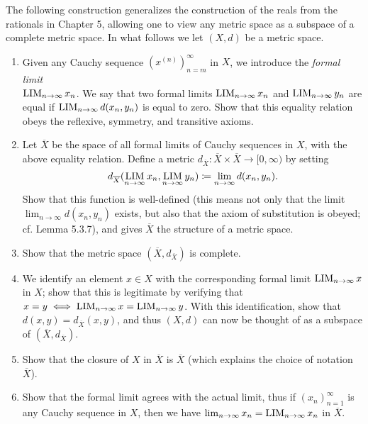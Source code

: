 \begin{ex}\label{ii:ex:1.4.8}
  The following construction generalizes the construction of the reals from the rationals in Chapter 5, allowing one to view any metric space as a subspace of a complete metric space.
  In what follows we let \((X, d)\) be a metric space.
  \begin{enumerate}
    \item Given any Cauchy sequence \((x^{(n)})_{n = m}^\infty\) in \(X\), we introduce the \emph{formal limit} \\
          \(\operatorname*{LIM}_{n \to \infty} x_n\).
          We say that two formal limits \(\operatorname*{LIM}_{n \to \infty} x_n\) and \(\operatorname*{LIM}_{n \to \infty} y_n\) are equal if \(\operatorname*{LIM}_{n \to \infty} d(x_n, y_n)\) is equal to zero.
          Show that this equality relation obeys the reflexive, symmetry, and transitive axioms.
    \item Let \(\overline{X}\) be the space of all formal limits of Cauchy sequences in \(X\), with the above equality relation.
          Define a metric \(d_{\overline{X}} : \overline{X} \times \overline{X} \to [0, \infty)\) by setting
          \[
            d_{\overline{X}}(\operatorname*{LIM}_{n \to \infty} x_n, \operatorname*{LIM}_{n \to \infty} y_n) \coloneqq \lim_{n \to \infty} d(x_n, y_n).
          \]
          Show that this function is well-defined (this means not only that the limit \\
          \(\lim_{n \to \infty} d(x_n, y_n)\) exists, but also that the axiom of substitution is obeyed;
          cf. Lemma 5.3.7), and gives \(\overline{X}\) the structure of a metric space.
    \item Show that the metric space \((\overline{X}, d_{\overline{X}})\) is complete.
    \item We identify an element \(x \in X\) with the corresponding formal limit \(\operatorname*{LIM}_{n \to \infty} x\) in \(X\);
          show that this is legitimate by verifying that \(x = y \iff \operatorname*{LIM}_{n \to \infty} x = \operatorname*{LIM}_{n \to \infty} y\).
          With this identification, show that \(d(x, y) = d_{\overline{X}}(x, y)\), and thus \((X, d)\) can now be thought of as a subspace of \((\overline{X}, d_{\overline{X}})\).
    \item Show that the closure of \(X\) in \(\overline{X}\) is \(\overline{X}\) (which explains the choice of notation \(\overline{X}\)).
    \item Show that the formal limit agrees with the actual limit, thus if \((x_n)_{n = 1}^\infty\) is any Cauchy sequence in \(X\), then we have \(\lim_{n \to \infty} x_n = \operatorname*{LIM}_{n \to \infty} x_n\) in \(\overline{X}\).
  \end{enumerate}
\end{ex}

